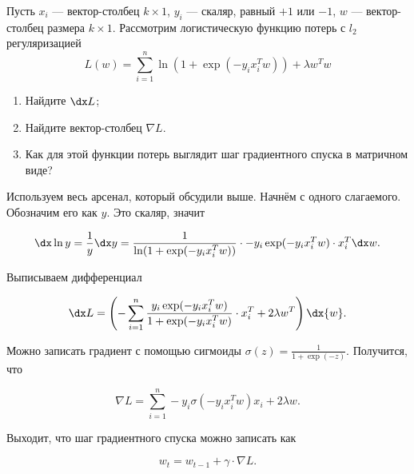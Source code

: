 \begin{problem}{}
	Пусть $x_i$ — вектор-столбец $k\times 1$, $y_i$ — скаляр, равный $+1$ или $-1$, $w$ — вектор-столбец размера $k\times 1$. Рассмотрим логистическую функцию потерь с $l_2$ регуляризацией
	\[
	L(w) = \sum_{i=1}^n \ln (1 + \exp(-y_ix_i^Tw)) + \lambda w^T w
	\]
	
	\begin{enumerate}
		\item Найдите $\dx L$;
		\item Найдите вектор-столбец $\nabla L$.
		\item Как для этой функции потерь выглядит шаг градиентного спуска в матричном виде? 
	\end{enumerate}
\end{problem}
\begin{sol} 
Используем весь арсенал, который обсудили выше. Начнём с одного слагаемого. Обозначим его как $y$. Это скаляр, значит

\[
\dx \ln y = \frac{1}{y} \dx y =  \frac{1}{\ln (1 + \exp(-y_ix_i^Tw))} \cdot -y_i \exp(-y_i x_i^T w) \cdot x_i^T \dx w.
\]

Выписываем дифференциал

\[
\dx L = \left( - \sum_{i=1}^n \frac{y_i \exp(-y_i x_i^T w)}{1 + \exp(-y_ix_i^Tw)} \cdot x_i^T + 2 \lambda w^T  \right) \dx{w}.
\]

Можно записать градиент с помощью сигмоиды $\sigma(z) = \frac{1}{1 + \exp(-z)}.$ Получится, что 

\[
\nabla L = \sum_{i=1}^n -y_i \sigma(-y_i x_i^T w) x_i + 2 \lambda w.
\]

Выходит, что шаг градиентного спуска можно записать как 

\[
w_t = w_{t-1} + \gamma \cdot \nabla L.
\]
\end{sol} 


